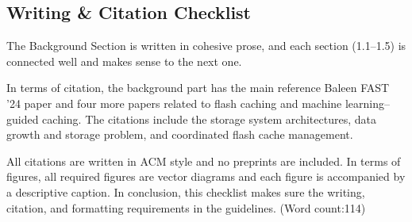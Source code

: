 \subsection{Writing \& Citation Checklist}

The Background Section is written in cohesive prose, and each section (1.1–1.5) is connected well and makes sense to the next one.

In terms of citation, the background part has the main reference Baleen FAST ’24 paper and four more papers related to flash caching and machine learning–guided caching. The citations include the storage system architectures, data growth and storage problem, and coordinated flash cache management. 

All citations are written in ACM style and no preprints are included. In terms of figures, all required figures are vector diagrams and each figure is accompanied by a descriptive caption. In conclusion, this checklist makes sure the writing, citation, and formatting requirements in the guidelines. ({Word count:}114)

